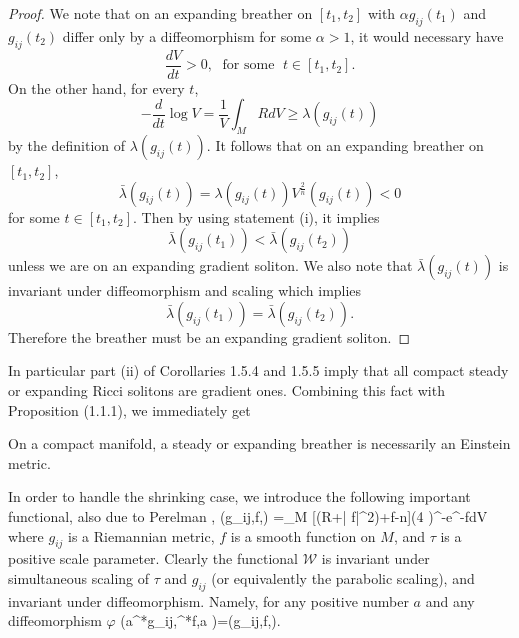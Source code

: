\begin{proof}
We note that on an expanding breather on $[t_1,t_2]$ with $\alpha
g_{ij}(t_1)$ and $g_{ij}(t_2)$ differ only by a diffeomorphism for
some $\alpha>1$, it would necessary have
$$
\frac{dV}{dt}>0,\; \text{ for some }\;t\in[t_1,t_2].
$$
On the other hand, for every $t$,
$$
-\frac{d}{dt}\log V=\frac{1}{V}\int_MRdV\ge \lambda(g_{ij}(t))
$$
by the definition of $\lambda(g_{ij}(t))$. It follows that on an
expanding breather on $[t_1,t_2]$,
$$
\bar{\lambda}(g_{ij}(t))
=\lambda(g_{ij}(t))V^\frac{2}{n}(g_{ij}(t))<0
$$
for some $t\in[t_1,t_2]$. Then by using statement (i), it implies
$$
\bar{\lambda}(g_{ij}(t_1))<\bar{\lambda}(g_{ij}(t_2))
$$ unless we
are on an expanding gradient soliton. We also note that
$\bar{\lambda}(g_{ij}(t))$ is invariant under diffeomorphism and
scaling which implies
$$
\bar{\lambda}(g_{ij}(t_1))=\bar{\lambda}(g_{ij}(t_2)).
$$
Therefore the breather must be an expanding gradient soliton.
\end{proof}

In particular part (ii) of Corollaries 1.5.4 and 1.5.5  imply that
all compact steady or expanding Ricci solitons are gradient ones.
Combining this fact with Proposition (1.1.1), we immediately get

\begin{proposition}
  \label{prop:cz-steady-and-expanding-breathers-are-einstein}
On a compact manifold, a steady or expanding breather is necessarily
an Einstein metric.
\end{proposition}

In order to handle the shrinking case, we introduce the following
important functional, also due to Perelman \cite{P1}, \be
{}(g_{ij},f,\tau) =\int_M [\tau (R+|\nabla
f|^2)+f-n](4\pi
\tau)^{-}e^{-f}dV %
\ee where $g_{ij}$ is a Riemannian metric, $f$ is a smooth
function on $M$, and $\tau$ is a positive scale parameter. Clearly
the functional $\mathcal{W}$ is invariant under simultaneous
scaling of $\tau$ and $g_{ij}$ (or equivalently the parabolic
scaling), and invariant under diffeomorphism. Namely, for any
positive number $a$ and any diffeomorphism $\varphi$ \be
{}(a\varphi^*g_{ij},\varphi^*f,a
\tau)=(g_{ij},f,\tau).%
\ee


